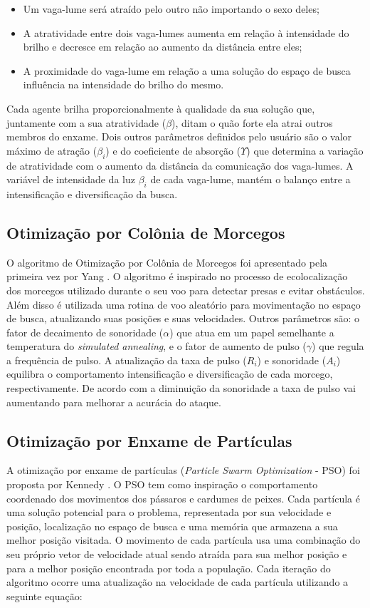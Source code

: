 \begin{itemize}
\item Um vaga-lume será atraído pelo outro não importando o sexo deles;

\item A atratividade entre dois vaga-lumes aumenta em relação à intensidade do brilho e decresce em relação ao aumento da distância entre eles;

\item A proximidade do vaga-lume em relação a uma solução do espaço de busca influência na intensidade do brilho do mesmo.
\end{itemize}

Cada agente brilha proporcionalmente à qualidade da sua solução que, juntamente com a sua atratividade ($\beta$), ditam o quão forte ela atrai outros membros do enxame. Dois outros parâmetros definidos pelo usuário são o valor máximo de atração ($\beta_i$) e do coeficiente de absorção ($\Upsilon$) que determina a variação de atratividade com o aumento da distância da comunicação dos vaga-lumes. A variável
de intensidade da luz $\beta_i$ de cada vaga-lume, mantém o balanço entre a intensificação e diversificação da busca.

\subsection{Otimização por Colônia de Morcegos}
\label{sec:bat_algorithm}
O algoritmo de Otimização por Colônia de Morcegos foi apresentado pela primeira vez por Yang \cite{bat}. O algoritmo é inspirado no processo de ecolocalização dos morcegos utilizado durante o seu voo para detectar presas e evitar obstáculos. Além disso é utilizada uma rotina de voo aleatório para movimentação no espaço de busca, atualizando suas posições e suas velocidades. Outros parâmetros são: o fator de decaimento de sonoridade ($\alpha$) que atua em um papel semelhante a temperatura do \textit{simulated annealing}, e o fator de aumento de pulso ($\gamma$) que regula a frequência de pulso. A atualização da taxa de pulso ($R_i$) e sonoridade ($A_i$) equilibra o comportamento intensificação e diversificação de cada morcego, respectivamente. De acordo com a diminuição da sonoridade a taxa de pulso vai aumentando para melhorar a acurácia do ataque.

\subsection{Otimização por Enxame de Partículas}
\label{sec:particle_swarm_optimization}
A otimização por enxame de partículas (\textit{Particle Swarm Optimization} - PSO) foi proposta por Kennedy \cite{pso}. O PSO tem como inspiração o comportamento coordenado dos movimentos dos pássaros e cardumes de peixes. Cada partícula é uma solução potencial para o problema, representada por sua velocidade e posição, localização no espaço de busca e uma memória que armazena a sua melhor posição visitada. O movimento de cada partícula usa uma combinação do seu próprio vetor de velocidade atual sendo atraída para sua melhor posição e para a melhor posição encontrada por toda a população. Cada iteração do algoritmo ocorre uma atualização na velocidade de cada partícula utilizando a seguinte equação:

